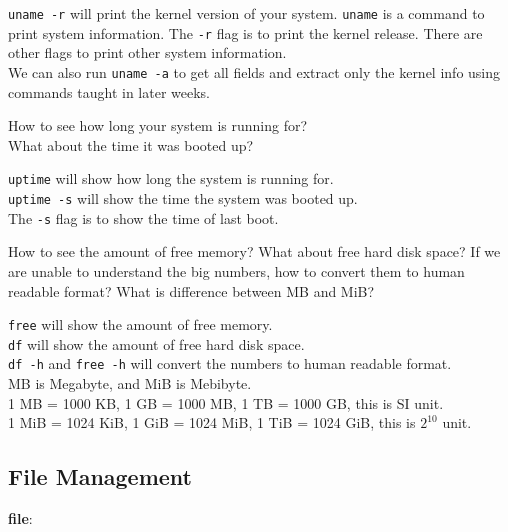 \begin{ans}
  \texttt{uname -r} will print the kernel version of your system.
  \texttt{uname} is a command to print system information.
  The \texttt{-r} flag is to print the kernel release.
  There are other flags to print other system information. \\
  We can also run \texttt{uname -a} to get all fields and extract only the
  kernel info using commands taught in later weeks.
\end{ans}

\begin{qs}
  How to see how long your system is running for? \\
  What about the time it was booted up?
\end{qs}

\begin{ans}
  \texttt{uptime} will show how long the system is running for.\\
  \texttt{uptime -s} will show the time the system was booted up. \\
  The \texttt{-s} flag is to show the time of last boot.
\end{ans}

\begin{qs}
  How to see the amount of free memory? What about free hard disk space?
  If we are unable to understand the big numbers, how to convert them to human readable format?
  What is difference between MB and MiB?
\end{qs}

\begin{ans}
  \texttt{free} will show the amount of free memory. \\
  \texttt{df} will show the amount of free hard disk space. \\
  \texttt{df -h} and \texttt{free -h}
  will convert the numbers to human readable format. \\
  MB is Megabyte, and MiB is Mebibyte. \\
  1 MB = 1000 KB, 1 GB = 1000 MB, 1 TB = 1000 GB, this is SI unit. \\
  1 MiB = 1024 KiB, 1 GiB = 1024 MiB, 1 TiB = 1024 GiB, this is $2^{10}$ unit.
\end{ans}

\subsection{File Management}

\textbf{file}:

